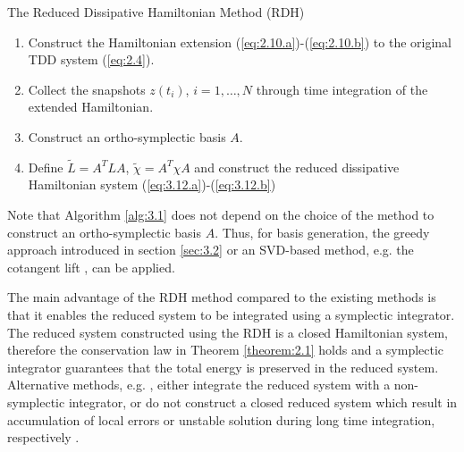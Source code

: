 \begin{algorithm}
\caption{The Reduced Dissipative Hamiltonian Method (RDH)} \label{alg:3.1}
\begin{enumerate}
	\item Construct the Hamiltonian extension (\ref{eq:2.10.a})-(\ref{eq:2.10.b}) to the original TDD system (\ref{eq:2.4}).
	\item Collect the snapshots $z(t_i)$, $i=1,\dots,N$ through time integration of the extended Hamiltonian.
	\item Construct an ortho-symplectic basis $A$.
	\item Define $\tilde L = A^T L A$, $\tilde \chi = A^T \chi A$ and construct the reduced dissipative Hamiltonian system (\ref{eq:3.12.a})-(\ref{eq:3.12.b})
\end{enumerate}
\end{algorithm}

Note that Algorithm \ref{alg:3.1} does not depend on the choice of the method to construct an ortho-symplectic basis $A$. Thus, for basis generation, the greedy approach introduced in section \ref{sec:3.2} or an SVD-based method, e.g. the cotangent lift \cite{Peng:2014di}, can be applied.

The main advantage of the RDH method compared to the existing methods is that it enables the reduced system to be integrated using a symplectic integrator. The reduced system constructed using the RDH is a closed Hamiltonian system, therefore the conservation law in Theorem \ref{theorem:2.1} holds and a symplectic integrator guarantees that the total energy is preserved in the reduced system. Alternative methods, e.g. \cite{peng2016geometric,Polyuga:2010gj,beattie2011structure}, either integrate the reduced system with a non-symplectic integrator, or do not construct a closed reduced system which result in accumulation of local errors or unstable solution during long time integration, respectively \cite{Hairer:1250576}.
